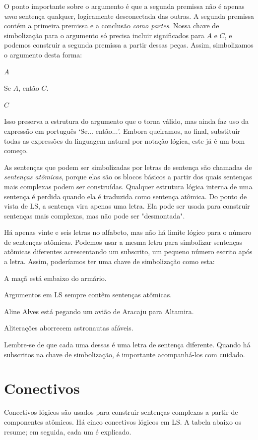 O ponto importante sobre o argumento é que a segunda premissa não é apenas \emph{uma} sentença qualquer, logicamente desconectada das outras. A segunda premissa contém a primeira premissa e a conclusão \emph{como partes}. Nossa chave de simbolização para o argumento só precisa incluir significados para $A$ e $C$, e podemos construir a segunda premissa a partir dessas peças. Assim, simbolizamos o argumento desta forma:
\begin{earg}
\item[] $A$
\item[] Se $A$, então $C$.
\item[\therefore] $C$
\end{earg}
Isso preserva a estrutura do argumento que o torna válido, mas ainda faz uso da expressão em português `Se$\ldots$ então$\ldots$'. Embora queiramos, ao final, substituir todas as expressões da linguagem natural por notação lógica, este já é um bom começo.

As sentenças que podem ser simbolizadas por letras de sentença são chamadas de \emph{sentenças atômicas}, porque elas são os blocos básicos a partir dos quais sentenças mais complexas podem ser construídas. Qualquer estrutura lógica interna de uma sentença é perdida quando ela é traduzida como sentença atômica. Do ponto de vista de LS, a sentença vira apenas uma letra. Ela pode ser usada para construir sentenças mais complexas, mas não pode ser "desmontada".

Há apenas vinte e seis letras no alfabeto, mas não há limite lógico para o número de sentenças atômicas. Podemos usar a mesma letra para simbolizar sentenças atômicas diferentes acrescentando um subscrito, um pequeno número escrito após a letra. Assim, poderíamos ter uma chave de simbolização como esta:
\begin{ekey}
\item[A$_1$:] A maçã está embaixo do armário.
\item[A$_2$:] Argumentos em LS sempre contêm sentenças atômicas.
\item[A$_3$:] Aline Alves está pegando um avião de Aracaju para Altamira.
\item[$\vdots$]
\item[A$_{294}$:] Aliterações aborrecem astronautas afáveis.
\end{ekey}
Lembre-se de que cada uma dessas é uma letra de sentença diferente. Quando há subscritos na chave de simbolização, é importante acompanhá-los com cuidado.


\section{Conectivos}
Conectivos lógicos são usados para construir sentenças complexas a partir de componentes atômicos. Há cinco conectivos lógicos em LS. A tabela abaixo os resume; em seguida, cada um é explicado.


